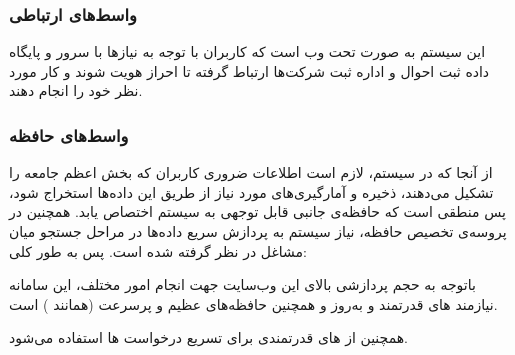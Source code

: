 \documentclass[12pt,svgnames,oneside]{book}
\newcounter{itemadded}
\let\LaTeXStandardEnumerateBegin\enumerate
\let\LaTeXStandardEnumerateEnd\endenumerate
\renewenvironment{enumerate}{%
	\LaTeXStandardEnumerateBegin%
	\setcounter{itemadded}{0}
}{%
	\LaTeXStandardEnumerateEnd%
}%
\begin{document}
				\subsubsection{واسط‌های ارتباطی}
					این سیستم به صورت تحت‌ وب است که کاربران با توجه به نیاز‌ها با سرور و پایگاه داده ثبت احوال و اداره ثبت شرکت‌ها ارتباط گرفته تا احراز هویت شوند و کار مورد نظر خود را انجام دهند.

				\subsubsection{واسط‌های حافظه}
					از آنجا که در سیستم، لازم است اطلاعات ضروری کاربران که بخش اعظم جامعه را تشکیل می‌دهند، ذخیره و آمارگیری‌های مورد نیاز از طریق این داده‌ها استخراج شود، پس منطقی است که حافظه‌ی جانبی قابل توجهی به سیستم اختصاص یابد. همچنین در
					پروسه‌ی تخصیص حافظه، نیاز سیستم به پردازش سریع داده‌ها در مراحل جستجو میان مشاغل در نظر گرفته شده ‌است.
					پس به طور کلی:

					\begin{enumerate}
						\item
						باتوجه به حجم پردازشی بالای این وب‌سایت جهت انجام امور مختلف، این سامانه نیازمند های قدرتمند و به‌روز و همچنین حافظه‌های عظیم و پرسرعت (همانند ) است.

						\item
						همچنین از های قدرتمندی برای تسریع درخواست ها استفاده می‌شود.
					\end{enumerate}
\end{document}
